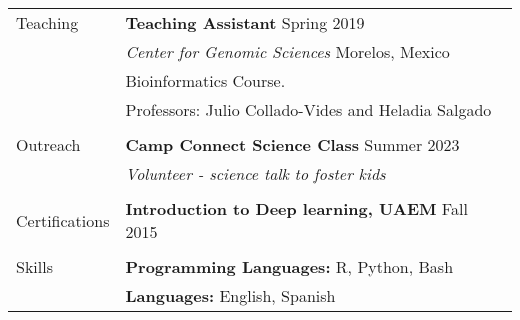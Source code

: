 \documentclass[letterpaper, 11pt]{article}
\begin{document}
\begin{longtable}{p{1.1in}p{6.05in}}
{\sc Teaching}
& \textbf{Teaching Assistant} \hfill Spring 2019 \\
& \textit{Center for Genomic Sciences} \hfill Morelos, Mexico\\
& Bioinformatics Course. \\ & Professors: Julio Collado-Vides and Heladia Salgado \\
& \\

{\sc Outreach}
& \textbf{Camp Connect Science Class} \hfill Summer 2023 \\
& \textit{Volunteer - science talk to foster kids} \\
& \\

{\sc Certifications}
& \textbf{Introduction to Deep learning, UAEM} \hfill  Fall 2015 \\
& \\

{\sc Skills}
& \textbf{Programming Languages:} R, Python, Bash \\

& \textbf{Languages:}  English, Spanish\\






\end{longtable}
\end{document}
